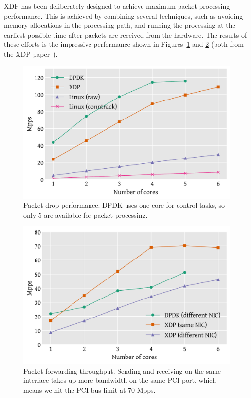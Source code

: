 \documentclass[sigconf]{acmart}
\begin{document}
XDP has been deliberately designed to achieve maximum packet processing
performance. This is achieved by combining several techniques, such as avoiding
memory allocations in the processing path, and running the processing at the
earliest possible time after packets are received from the hardware. The results
of these efforts is the impressive performance shown in
Figures~\ref{fig:drop-test} and \ref{fig:redirect-test} (both from the XDP
paper~\cite{xdp-paper}).

\begin{figure}[t]
\centering
\includegraphics[width=\linewidth]{images/drop-test.pdf}
\caption{\label{fig:drop-test} Packet drop performance. DPDK uses one core for
  control tasks, so only 5 are available for packet processing.}
\end{figure}

\begin{figure}[t]
\centering
\includegraphics[width=\linewidth]{images/redirect-test.pdf}
\caption{\label{fig:redirect-test} Packet forwarding throughput. Sending and
  receiving on the same interface takes up more bandwidth on the same PCI port,
  which means we hit the PCI bus limit at 70 Mpps.}
\end{figure}
\end{document}
